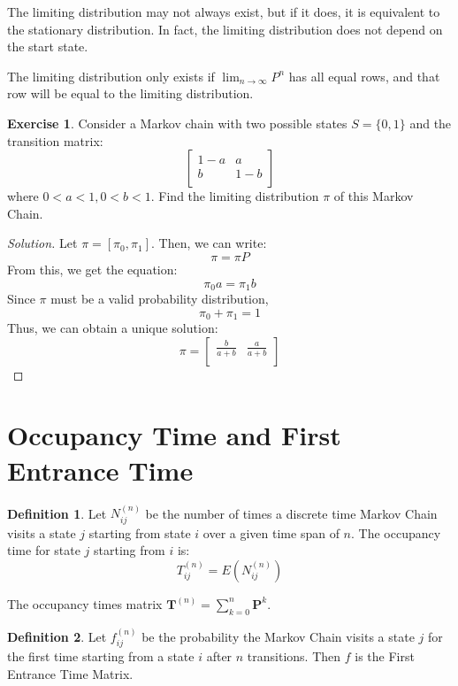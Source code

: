 \documentclass[12pt,letterpaper]{amsbook}
\theoremstyle{definition}
\newtheorem{definition}{Definition}%
\newtheorem*{exercise}{Exercise}
\newenvironment{solution}
  {\renewcommand\qedsymbol{$\blacksquare$}\begin{proof}[Solution]}
  {\end{proof}}
\begin{document}
The limiting distribution may not always exist, but if it does, it is equivalent to the stationary distribution. In fact, the limiting distribution does not depend on the start state.

The limiting distribution only exists if $\lim_{n \rightarrow \infty} P^n$ has all equal rows, and that row will be equal to the limiting distribution.

\begin{exercise}
  Consider a Markov chain with two possible states $S = \{0,1\}$  and the transition matrix:
  \[
  \begin{bmatrix}
    1-a & a \\
    b & 1-b \\
  \end{bmatrix}
  \]
  where $0 < a < 1, 0 < b < 1$. Find the limiting distribution $\pi$ of this Markov Chain.
\end{exercise}
\begin{solution}
  Let $\pi = [\pi_0, \pi_1]$. Then, we can write:
  \[\pi = \pi P\]
  From this, we get the equation:
  \[\pi_0 a = \pi_1 b\]
  Since $\pi$ must be a valid probability distribution,
  \[\pi_0 + \pi_1 = 1\]
  Thus, we can obtain a unique solution:
  \[ \pi =  \begin{bmatrix}
  \frac{b}{a+b} & \frac{a}{a+b} \\
\end{bmatrix} \]
\end{solution}

\section{Occupancy Time and First Entrance Time}

\begin{definition}
  Let $N_{ij}^{(n)}$ be the number of times a discrete time Markov Chain visits a state $j$ starting from state $i$ over a given time span of $n$. The occupancy time for state $j$ starting from $i$ is:
  \[T_{ij}^{(n)} = E(N_{ij}^{(n)})\]
\end{definition}

\begin{theorem}
  The occupancy times matrix $\mathbf{T}^{(n)} = \sum_{k=0}^{n} \mathbf{P}^{k}$.  
\end{theorem}

\begin{definition}
  Let $f_{ij}^{(n)}$ be the probability the Markov Chain visits a state $j$ for the first time starting from a state $i$ after $n$ transitions. Then $f$ is the First Entrance Time Matrix.
\end{definition}
\end{document}
